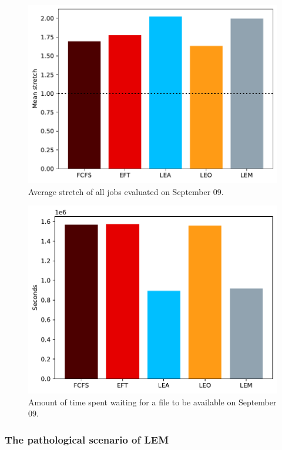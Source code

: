 \documentclass[conference,10pt]{IEEEtran}
\begin{document}
\begin{figure}[tb]\centering\includegraphics[scale=0.47]{../MBSS/plot/Results_FCFS_Score_Backfill_2022-09-09->2022-09-09_V10000_Mean_Stretch_450_128_32_256_4_1024.pdf}\caption{Average stretch of all jobs evaluated on September 09.}\end{figure}
\begin{figure}[tb]\centering\includegraphics[scale=0.47]{../MBSS/plot/Results_FCFS_Score_Backfill_2022-09-09->2022-09-09_V10000_Total_waiting_for_a_load_time_and_transfer_time_450_128_32_256_4_1024.pdf}\caption{Amount of time spent waiting for a file to be available on September 09.}\end{figure}

\subsubsection{The pathological scenario of LEM}
\end{document}
